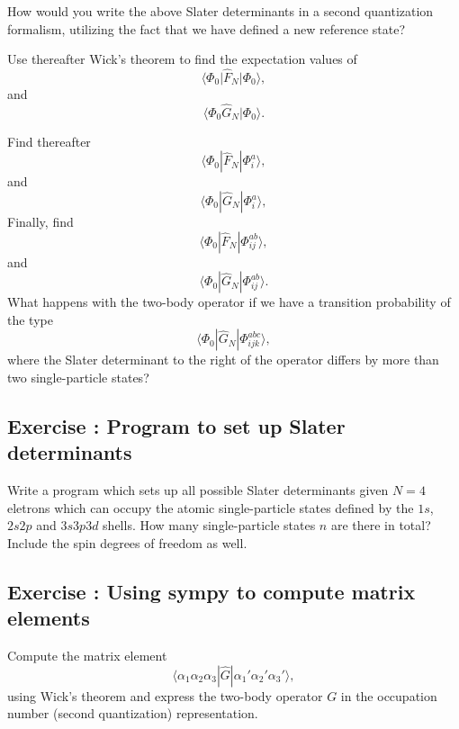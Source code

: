 \documentclass[graybox,sectrefs,envcountresetchap,open=right]{svmonodo}
\newenvironment{doconceexercise}{}{}
\newcounter{doconceexercisecounter}
\begin{document}
\begin{doconceexercise}
How would you write the above Slater determinants in a second quantization formalism, utilizing the fact that we have defined a new reference state? 

Use thereafter Wick's theorem to find the expectation values of 
\[
\langle \Phi_0 \vert\hat{F}_N\vert\Phi_0\rangle,
\]
and
\[
\langle \Phi_0\hat{G}_N|\Phi_0\rangle.
\]

Find thereafter 
\[
\langle \Phi_0 |\hat{F}_N|\Phi_i^a\rangle,
\]
and
\[
\langle \Phi_0|\hat{G}_N|\Phi_i^a\rangle,
\]
Finally, find
\[
\langle \Phi_0 |\hat{F}_N|\Phi_{ij}^{ab}\rangle,
\]
and
\[
\langle \Phi_0|\hat{G}_N|\Phi_{ij}^{ab}\rangle.
\]
What happens with the two-body operator if we have a transition probability  of the type
\[
\langle \Phi_0|\hat{G}_N|\Phi_{ijk}^{abc}\rangle,
\]
where the Slater determinant to the right of the operator differs by more than two single-particle states?

\end{doconceexercise}




\begin{doconceexercise}

\subsection*{Exercise \thedoconceexercisecounter: Program to set up Slater determinants}


Write a program which sets up all possible Slater determinants given $N=4$ eletrons which can occupy
the atomic single-particle states defined by the $1s$, $2s2p$ and $3s3p3d$ shells. How many single-particle
states $n$ are there in total?  Include the spin degrees of freedom as well.

\end{doconceexercise}




\begin{doconceexercise}

\subsection*{Exercise \thedoconceexercisecounter: Using sympy to compute matrix elements}


Compute the matrix element
\[
\langle\alpha_{1}\alpha_{2}\alpha_{3}|\hat{G}|\alpha_{1}'\alpha_{2}'\alpha_{3}'\rangle,
\]
using Wick's theorem and express the two-body operator
$G$ in the occupation number (second quantization) 
representation.

\end{doconceexercise}
\end{document}
